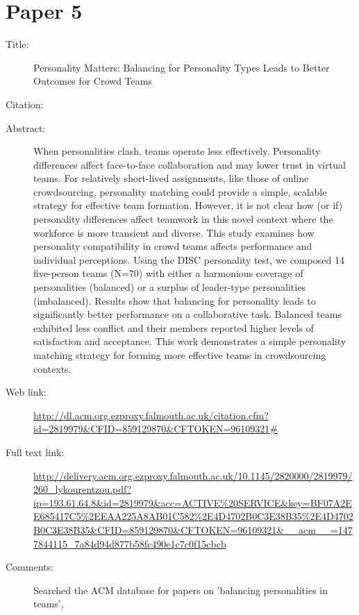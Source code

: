 \documentclass{scrartcl}
\begin{document}
\section*{Paper 5}
\begin{description}
\item[Title:] {Personality Matters: Balancing for Personality Types Leads to Better Outcomes for Crowd Teams}
\item[Citation:] \cite{Paper5}
\item[Abstract:]{ When personalities clash, teams operate less effectively. Personality differences affect face-to-face collaboration and may lower trust in virtual teams. For relatively short-lived assignments, like those of online crowdsourcing, personality matching could provide a simple, scalable strategy for effective team formation. However, it is not clear how (or if) personality differences affect teamwork in this novel context where the workforce is more transient and diverse. This study examines how personality compatibility in crowd teams affects performance and individual perceptions. Using the DISC personality test, we composed 14 five-person teams (N=70) with either a harmonious coverage of personalities (balanced) or a surplus of leader-type personalities (imbalanced). Results show that balancing for personality leads to significantly better performance on a collaborative task. Balanced teams exhibited less conflict and their members reported higher levels of satisfaction and acceptance. This work demonstrates a simple personality matching strategy for forming more effective teams in crowdsourcing contexts.}
\item[Web link:] \url{http://dl.acm.org.ezproxy.falmouth.ac.uk/citation.cfm?id=2819979&CFID=859129870&CFTOKEN=96109321#}
\item[Full text link:] \url{http://delivery.acm.org.ezproxy.falmouth.ac.uk/10.1145/2820000/2819979/260_lykourentzou.pdf?ip=193.61.64.8&id=2819979&acc=ACTIVE%20SERVICE&key=BF07A2EE685417C5%2EEAA225A8AB01C582%2E4D4702B0C3E38B35%2E4D4702B0C3E38B35&CFID=859129870&CFTOKEN=96109321&__acm__=1477844115_7a84d94d877b58fc490e1c7c0f15cbcb}
\item[Comments:] Searched the ACM database for papers on 'balancing personalities in teams', 
\end{description}



\end{document}
